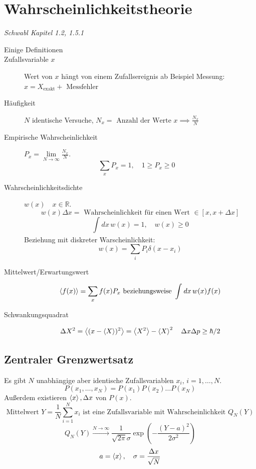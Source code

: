 \documentclass[11pt]{article}
\theoremstyle{plain}
\theoremstyle{mytheoremstyle}
\newcommand{\R}{\mathbb{R}}
\begin{document}
\section{Wahrscheinlichkeitstheorie}
\emph{Schwabl Kapitel 1.2, 1.5.1} \\
\begin{description}
  \item [Einige Definitionen]

  \item [Zufallsvariable $x$] Wert von $x$ h\"angt von einem Zufallsereignis ab
    Beispiel Messung: $x= X_{\text{exakt}} + \text{ Messfehler }$

  \item[H\"aufigkeit] 
    $N$ identische Versuche, $N_x = \text{ Anzahl der Werte } x \implies \frac{N_x}{N}$

  \item[Empirische Wahrscheinlichkeit]
    $P_x = \lim\limits_{N \to \infty } \frac{N_x}{N}$.
    \[ \sum_{x}{} P_x = 1 , \quad 1 \ge P_x \ge 0 \quad \] 

  \item[Wahrscheinlichkeitsdichte] 
    $w(x) \quad x \in \R$. \[ w(x)\Delta x = \text{ Wahrscheinlichkeit f\"ur einen
      Wert } \in [x, x+\Delta x]  \] 
      \[ \int_{}^{}dx\, w(x)=1, \quad w(x)\ge 0 \] 
      Beziehung mit diskreter Warscheinlichkeit: 
      \[ w(x) = \sum_{i}{}P_i \delta ( x-x_i) \] 

  \item[Mittelwert/Erwartungswert]
    \[ \Braket{f(x)} = \sum_{x}{} f(x) P_x \text{ beziehungsweise } \int_{}^{}
      dx\, w(x) f(x)\] 

  \item [Schwankungsquadrat] \[ \Delta X^2 = \Braket{(x-\Braket{X})^2}
    = \Braket{X^2}- \Braket{X}^2 \quad \Delta x \Delta p \ge \hbar/2\] 
\end{description}
\subsection{Zentraler Grenzwertsatz}
Es gibt $N$ unabh\"angige aber identische Zufallsvariablen $x_i, \, i=1 , \dotsc , N$.
\[ P(x_1,\dotsc,x_N)= P(x_1) P(x_2) \ldots P(x_N)  \]
Au\ss{}erdem existieren $\Braket{x},\Delta x$ von  $P(x)$.
\[ \text{Mittelwert } Y= \frac{1}{N}\sum_{i=1}^{N}x_i  \text{ ist eine
Zufallsvariable mit Wahrscheinlichkeit } Q_N(Y) \] 
\[ Q_N(Y) \xrightarrow{N\to \infty}\frac{1}{\sqrt{2 \pi} \sigma}
\exp{(-\frac{(Y-a)^2}{2 \sigma^2})}\] 
\[ a=\Braket{x}, \quad \sigma= \frac{\Delta x}{ \sqrt{N}} \] 
\end{document}
